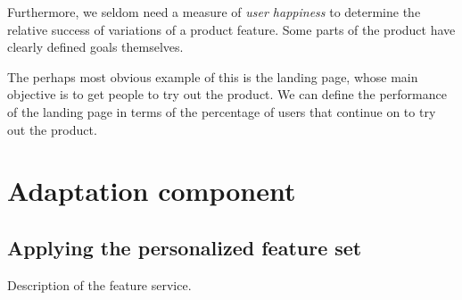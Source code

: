 Furthermore, we seldom need a measure of \emph{user happiness} to determine the relative success of variations of a product feature. Some parts of the product have clearly defined goals themselves.

The perhaps most obvious example of this is the landing page, whose main objective is to get people to try out the product. We can define the performance of the landing page in terms of the percentage of users that continue on to try out the product.

\section{Adaptation component} %
\label{approach:sec:adaptation_component}


\subsection{Applying the personalized feature set} %
\label{approach:sec:applying_the_personalized_feature_set}

Description of the feature service.
